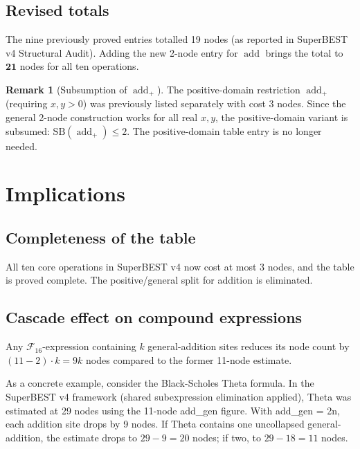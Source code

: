 \documentclass[12pt,a4paper]{article}
\theoremstyle{definition}
\newtheorem{remark}[theorem]{Remark}
\newcommand{\addop}{\operatorname{add}}
\newcommand{\SB}{\mathrm{SB}}
\newcommand{\F}{\mathcal{F}_{16}}
\begin{document}
\subsection*{Revised totals}

The nine previously proved entries totalled 19 nodes
(as reported in SuperBEST v4 Structural Audit).
Adding the new 2-node entry for $\addop$ brings the total to $\mathbf{21}$ nodes
for all ten operations.

\begin{remark}[Subsumption of $\addop_{+}$]
The positive-domain restriction $\addop_{+}$ (requiring $x, y > 0$) was
previously listed separately with cost 3 nodes.
Since the general 2-node construction works for all real $x, y$, the
positive-domain variant is subsumed: $\SB(\addop_{+}) \le 2$.
The positive-domain table entry is no longer needed.
\end{remark}

\section{Implications}
\label{sec:implications}

\subsection*{Completeness of the table}
All ten core operations in SuperBEST v4 now cost at most 3 nodes, and the
table is proved complete.
The positive/general split for addition is eliminated.

\subsection*{Cascade effect on compound expressions}
Any $\F$-expression containing $k$ general-addition sites reduces its node
count by $(11 - 2) \cdot k = 9k$ nodes compared to the former 11-node
estimate.

As a concrete example, consider the Black-Scholes Theta formula.
In the SuperBEST v4 framework (shared subexpression elimination applied),
Theta was estimated at 29 nodes using the 11-node add\_gen figure.
With add\_gen = 2n, each addition site drops by 9 nodes.
If Theta contains one uncollapsed general-addition, the estimate
drops to $29 - 9 = 20$ nodes; if two, to $29 - 18 = 11$ nodes.
\end{document}
